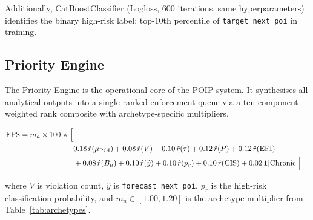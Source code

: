\documentclass[12pt,a4paper]{article}
\begin{document}
Additionally, CatBoostClassifier (Logloss, 600 iterations, same hyperparameters) identifies
the binary high-risk label: top-10th percentile of \texttt{target\_next\_poi} in training.

\subsection{Priority Engine}

The Priority Engine is the operational core of the POIP system. It synthesises all
analytical outputs into a single ranked enforcement queue via a ten-component weighted rank
composite with archetype-specific multipliers.

\begin{align}
\mathrm{FPS} = m_a \times 100 \times \Bigl[ \nonumber\\
  & 0.18\,\hat{r}(\mu_\mathrm{POI})
  + 0.08\,\hat{r}(V)
  + 0.10\,\hat{r}(\tau)
  + 0.12\,\hat{r}(P)
  + 0.12\,\hat{r}(\mathrm{EFI}) \nonumber\\
  & + 0.08\,\hat{r}(B_\mu)
  + 0.10\,\hat{r}(\hat{y})
  + 0.10\,\hat{r}(p_r)
  + 0.10\,\hat{r}(\mathrm{CIS})
  + 0.02\,\mathbf{1}[\text{Chronic}]
\Bigr] \label{eq:fps}
\end{align}

where $V$ is violation count, $\hat{y}$ is \texttt{forecast\_next\_poi}, $p_r$ is the
high-risk classification probability, and $m_a \in [1.00, 1.20]$ is the archetype
multiplier from Table~\ref{tab:archetypes}.
\end{document}
